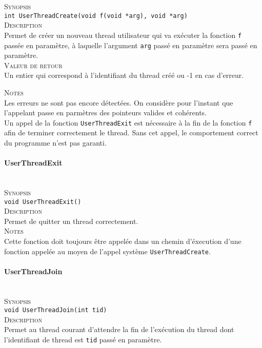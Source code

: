 \documentclass{report}
\newcommand{\myparagraph}[1]{\paragraph*{#1}\mbox{}\\}
\begin{document}
\textsc{Synopsis}\\
	\texttt{int UserThreadCreate(void f(void *arg), void *arg)}\\
	
\textsc{Description}\\
	Permet de créer un nouveau thread utilisateur qui va exécuter la fonction \texttt{f} passée en paramètre, à laquelle l'argument \texttt{arg} passé en paramètre sera passé en paramètre.\\
	
\textsc{Valeur de retour}\\
	Un entier qui correspond à l'identifiant du thread créé ou -1 en cas d'erreur.
	
\textsc{Notes}\\
	Les erreurs ne sont pas encore détectées. On considère pour l'instant que l'appelant passe en parmètres des pointeurs valides et cohérents.\\
	Un appel de la fonction \texttt{UserThreadExit} est nécessaire à la fin de la fonction \texttt{f} afin de terminer correctement le thread. Sans cet appel, le comportement correct du programme n'est pas garanti.
	
	
	
	
	
\myparagraph{UserThreadExit}

\textsc{Synopsis}\\
	\texttt{void UserThreadExit()}\\
	
\textsc{Description}\\
	Permet de quitter un thread correctement.\\
	
\textsc{Notes}\\
	Cette fonction doit toujours être appelée dans un chemin d'éxecution d'une fonction appelée au moyen de l'appel système \texttt{UserThreadCreate}.
	
	
	
	
	
\myparagraph{UserThreadJoin}

\textsc{Synopsis}\\
	\texttt{void UserThreadJoin(int tid)}\\
	
\textsc{Description}\\
	Permet au thread courant d'attendre la fin de l'exécution du thread dont l'identifiant de thread est \texttt{tid} passé en paramètre.\\
	
\end{document}
